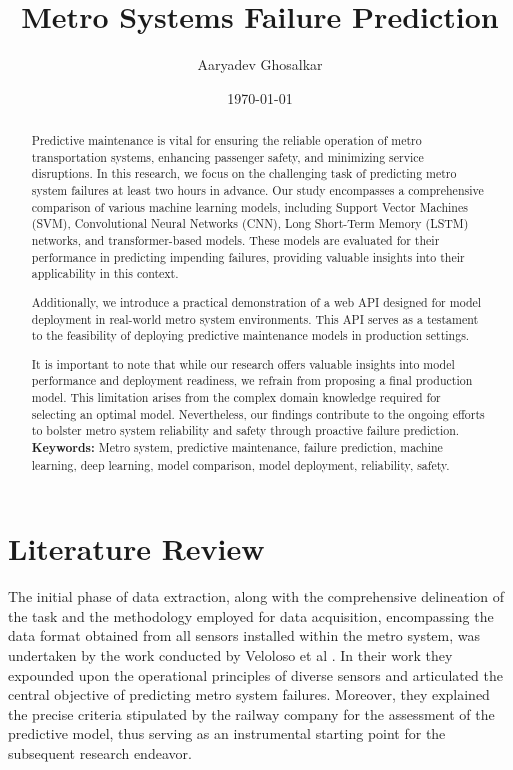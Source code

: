 \documentclass{article}
\title{Metro Systems Failure Prediction}
\author{Aaryadev Ghosalkar}
\date{\today}
\begin{document}
\maketitle

\begin{abstract}
Predictive maintenance is vital for ensuring the reliable operation of metro transportation systems, enhancing passenger safety, and minimizing service disruptions. In this research, we focus on the challenging task of predicting metro system failures at least two hours in advance. Our study encompasses a comprehensive comparison of various machine learning models, including Support Vector Machines (SVM), Convolutional Neural Networks (CNN), Long Short-Term Memory (LSTM) networks, and transformer-based models. These models are evaluated for their performance in predicting impending failures, providing valuable insights into their applicability in this context.

Additionally, we introduce a practical demonstration of a web API designed for model deployment in real-world metro system environments. This API serves as a testament to the feasibility of deploying predictive maintenance models in production settings.

It is important to note that while our research offers valuable insights into model performance and deployment readiness, we refrain from proposing a final production model. This limitation arises from the complex domain knowledge required for selecting an optimal model. Nevertheless, our findings contribute to the ongoing efforts to bolster metro system reliability and safety through proactive failure prediction. \\

\textbf{Keywords:} Metro system, predictive maintenance, failure prediction, machine learning, deep learning, model comparison, model deployment, reliability, safety.
\end{abstract}

\newpage

\section*{Literature Review}

The initial phase of data extraction, along with the comprehensive delineation
of the task and the methodology employed for data acquisition, encompassing the
data format obtained from all sensors installed within the metro system, was
undertaken by the work conducted by Veloloso et al \cite{Veloso2022}. In their work they expounded upon the operational principles of diverse sensors
and articulated the central objective of predicting metro system failures. 
Moreover, they explained the precise criteria stipulated by the railway company for the assessment of the predictive model, thus serving as an instrumental starting point for the subsequent research endeavor. \\
\end{document}
